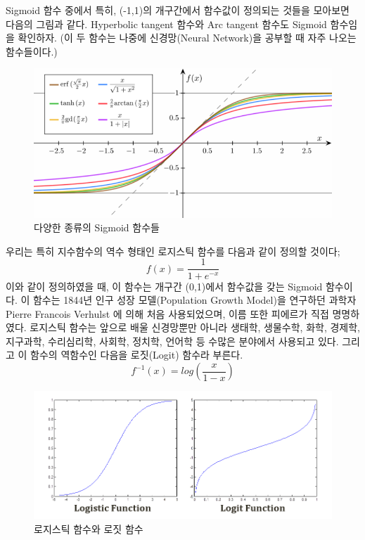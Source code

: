 \documentclass[a4paper]{oblivoir}
\begin{document}
\indent Sigmoid 함수 중에서 특히, (-1,1)의 개구간에서 함수값이 정의되는 것들을 모아보면 다음의 그림과 같다. Hyperbolic tangent 함수와 Arc tangent 함수도 Sigmoid 함수임을 확인하자. (이 두 함수는 나중에 신경망(Neural Network)을 공부할 때 자주 나오는 함수들이다.)
\begin{figure}[ht]
\centering
\includegraphics[scale=0.8]{Sigmoid_Functions.png}
\caption{다양한 종류의 Sigmoid 함수들}
\label{Figure 4-6}
\end{figure}

\indent 우리는 특히 지수함수의 역수 형태인 로지스틱 함수를 다음과 같이 정의할 것이다;
\begin{equation*}f(x) = \frac{1}{1+e^{-x}} \tag{4-1}\end{equation*} 이와 같이 정의하였을 때, 이 함수는 개구간 (0,1)에서 함수값을 갖는 Sigmoid 함수이다. 이 함수는 1844년 인구 성장 모델(Population Growth Model)을 연구하던 과학자 Pierre Francois Verhulst 에 의해 처음 사용되었으며, 이름 또한 피에르가 직접 명명하였다.  로지스틱 함수는 앞으로 배울 신경망뿐만 아니라 생태학, 생물수학, 화학, 경제학, 지구과학, 수리심리학, 사회학, 정치학, 언어학 등 수많은 분야에서 사용되고 있다. 그리고 이 함수의 역함수인 다음을 로짓(Logit) 함수라 부른다. \begin{equation*}f^{-1}(x) = log(\frac{x}{1-x}) \tag{4-2}\end{equation*}
\begin{figure}[ht]
\centering
\includegraphics[scale=0.7]{Logistic_Functions.png}
\caption{로지스틱 함수와 로짓 함수}
\label{Figure 4-7}
\end{figure}
\end{document}
